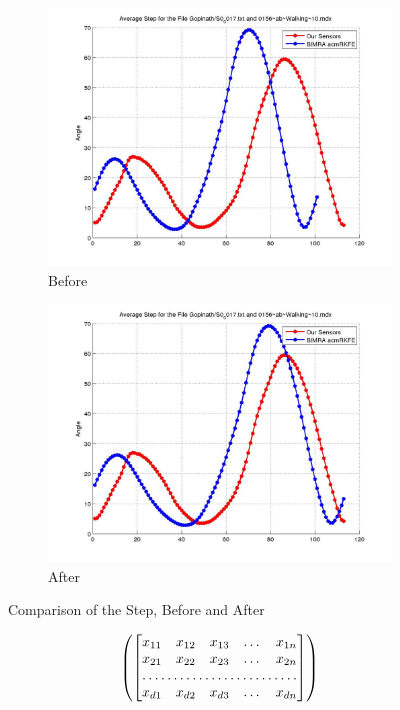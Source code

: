 \documentclass[12pt]{article}
\begin{document}
\begin{figure}[h]%

\begin{subfigure}[!htb]{2cm}
\hspace*{-2cm} \includegraphics[scale=.22]{S0_0017_before_acmrkfe.jpg}
\caption{Before}
\end{subfigure}
\hfill\hfill
\begin{subfigure}[h]{0.4\textwidth}
\hspace*{-2cm} \includegraphics[scale=.22]{S0_0017_after_acmrkfe.jpg}
\caption{After}
\end{subfigure}%

\caption[Hello]{Comparison of the Step, Before and After}
\end{figure}

\[
\left(
\begin{bmatrix}
   x_{11}       & x_{12} & x_{13} & \dots & x_{1n} \\
    x_{21}       & x_{22} & x_{23} & \dots & x_{2n} \\
    \hdotsfor{5} \\
    x_{d1}       & x_{d2} & x_{d3} & \dots & x_{dn}
\end{bmatrix}
\right)
\]


{}

\end{document}

